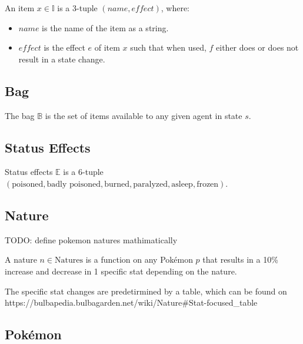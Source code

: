 An item $x \in \mathbb{I}$ is a 3-tuple $(name, effect)$, where:
\begin{itemize}
    \item $name$ is the name of the item as a string.
    \item $effect$ is the effect $e$ of item $x$ such that when used, $f$ either does or does not result in a state change.
\end{itemize}

\subsection{Bag}

The bag $\mathbb{B}$ is the set of items available to any given agent in state $s$.

\subsection{Status Effects}

Status effects $\mathbb{E}$ is a 6-tuple $( \text{poisoned}, \text{badly poisoned}, \text{burned}, \text{paralyzed}, \text{asleep}, \text{frozen} )$.

\subsection{Nature}

TODO: define pokemon natures mathimatically

A nature $n \in \text{Natures}$ is a function on any Pokémon $p$ that results in a 10\% increase and decrease in 1 specific stat depending on the nature.

The specific stat changes are predetirmined by a table, which can be found on 
https://bulbapedia.bulbagarden.net/wiki/Nature#Stat-focused_table

\subsection{Pokémon}

